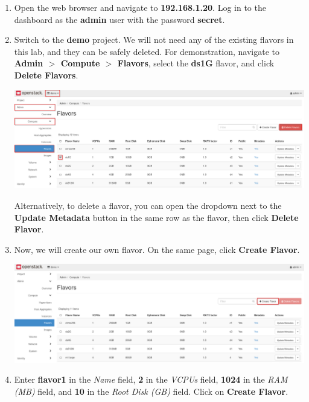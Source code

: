 \documentclass[letterpaper, 12pt]{article}
\begin{document}
\begin{enumerate}
    \item Open the web browser and navigate to \textbf{192.168.1.20}.
    Log in to the dashboard as the \textbf{admin} user with the password \textbf{secret}.

    \item Switch to the \textbf{demo} project.
    We will not need any of the existing flavors in this lab, and they can be safely deleted.
    For demonstration, navigate to \textbf{Admin $>$ Compute $>$ Flavors}, select the \textbf{ds1G} flavor, and click \textbf{Delete Flavors}.

    \begin{center}
        \includegraphics[width=\linewidth]{images/part2/step2.png}
    \end{center}

    \begin{tipbox}
        Alternatively, to delete a flavor, you can open the dropdown next to the \textbf{Update Metadata} button in the same row as the flavor, then click \textbf{Delete Flavor}.
    \end{tipbox}

    \item Now, we will create our own flavor.
    On the same page, click \textbf{Create Flavor}.

    \begin{center}
        \includegraphics[width=\linewidth]{images/part2/step3.png}
    \end{center}

    \item Enter \textbf{flavor1} in the \textit{Name} field, \textbf{2} in the \textit{VCPUs} field, \textbf{1024} in the \textit{RAM (MB)} field, and \textbf{10} in the \textit{Root Disk (GB)} field.
    Click on \textbf{Create Flavor}.


\end{enumerate}
\end{document}
